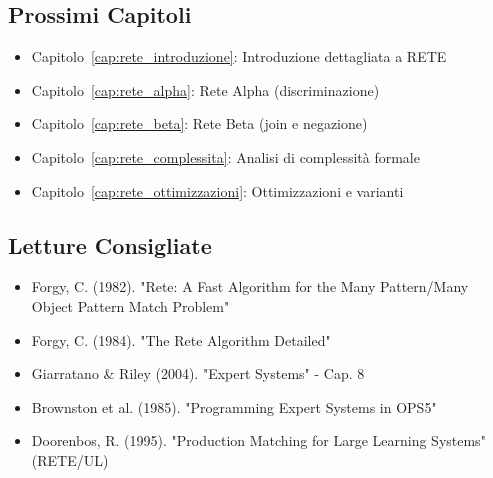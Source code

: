 \subsection{Prossimi Capitoli}

\begin{itemize}
\item Capitolo~\ref{cap:rete_introduzione}: Introduzione dettagliata a RETE
\item Capitolo~\ref{cap:rete_alpha}: Rete Alpha (discriminazione)
\item Capitolo~\ref{cap:rete_beta}: Rete Beta (join e negazione)
\item Capitolo~\ref{cap:rete_complessita}: Analisi di complessità formale
\item Capitolo~\ref{cap:rete_ottimizzazioni}: Ottimizzazioni e varianti
\end{itemize}

\subsection{Letture Consigliate}

\begin{itemize}
\item Forgy, C. (1982). "Rete: A Fast Algorithm for the Many Pattern/Many Object Pattern Match Problem"
\item Forgy, C. (1984). "The Rete Algorithm Detailed"
\item Giarratano \& Riley (2004). "Expert Systems" - Cap. 8
\item Brownston et al. (1985). "Programming Expert Systems in OPS5"
\item Doorenbos, R. (1995). "Production Matching for Large Learning Systems" (RETE/UL)
\end{itemize}
